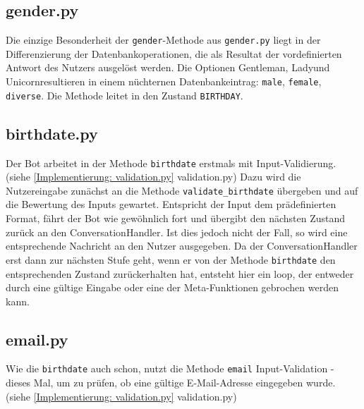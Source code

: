         \subsection{gender.py} \label{Implementierung: gender.py}
                Die einzige Besonderheit der \verb|gender|-Methode aus \verb|gender.py| liegt in der Differenzierung der Datenbankoperationen, die als Resultat der vordefinierten Antwort des Nutzers ausgelöst werden. Die Optionen \glqq Gentleman\grqq, \glqq Lady\grqq und \glqq Unicorn\grqq resultieren in einem nüchternen Datenbankeintrag: \verb|male|, \verb|female|, \verb|diverse|. Die Methode leitet in den Zustand \verb|BIRTHDAY|.
            
        

        \subsection{birthdate.py} \label{Implementierung: birthdate.py}
                Der Bot arbeitet in der Methode \verb|birthdate| erstmals mit Input-Validierung. (siehe \ref{Implementierung: validation.py} validation.py) Dazu wird die Nutzereingabe zunächst an die Methode \verb|validate_birthdate| übergeben und auf die Bewertung des Inputs gewartet. Entspricht der Input dem prädefinierten Format, fährt der Bot wie gewöhnlich fort und übergibt den nächsten Zustand zurück an den ConversationHandler. Ist dies jedoch nicht der Fall, so wird eine entsprechende Nachricht an den Nutzer ausgegeben. Da der ConversationHandler erst dann zur nächsten Stufe geht, wenn er von der Methode \verb|birthdate| den entsprechenden Zustand zurückerhalten hat, entsteht hier ein loop, der entweder durch eine gültige Eingabe oder eine der Meta-Funktionen gebrochen werden kann.
        
        
        \subsection{email.py} \label{Implementierung: email.py}
                Wie die \verb|birthdate| auch schon, nutzt die Methode \verb|email| Input-Validation - dieses Mal, um zu prüfen, ob eine gültige E-Mail-Adresse eingegeben wurde. (siehe \ref{Implementierung: validation.py} validation.py)


